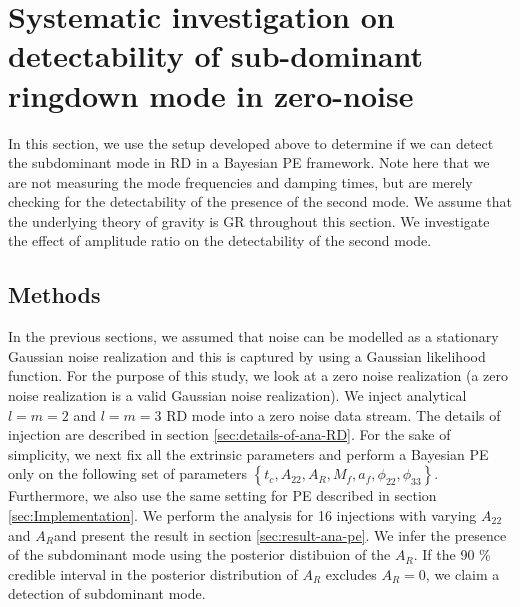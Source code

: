 

\section{Systematic investigation on detectability of sub-dominant ringdown mode in zero-noise}
\label{sec:anaRD}
In this section, we use the setup developed above to determine if we can detect the subdominant mode in RD in a Bayesian PE framework. Note here that we are not measuring the mode frequencies and damping times, but are merely checking for the detectability of the presence of the second mode. We assume that the underlying theory of gravity is GR throughout this section. We investigate the effect of amplitude ratio on the detectability of the second mode. 

\subsection{Methods}

In the previous sections, we assumed that noise can be modelled as a stationary Gaussian noise realization and this is captured by using a Gaussian likelihood function. For the purpose of this study, we look at a zero noise realization (a zero noise realization is a valid Gaussian noise realization). We inject analytical $l=m=2$ and $l=m=3$ RD mode into a zero noise data stream. The details of injection are described in section \ref{sec:details-of-ana-RD}. For the sake of simplicity, we next fix all the extrinsic parameters and perform a Bayesian PE only on the following set of parameters $\left\lbrace  t_{c}, A_{22}, A_{R}, M_{f}, a_{f}, \phi_{22}, \phi_{33 } \right\rbrace $. Furthermore, we also use the same setting for PE described in section \ref{sec:Implementation}.  We perform the analysis for 16 injections with varying $A_{22}$ and $A_{R}$and present the result in section \ref{sec:result-ana-pe}. We infer the presence of the subdominant mode using the posterior distibuion of the $A_{R}$. If the 90 \% credible interval in the posterior distribution of $A_{R}$ excludes $A_{R} =0$, we claim a detection of subdominant mode. 

